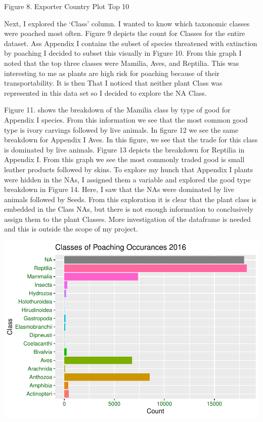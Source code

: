 \documentclass[
  12pt,
]{article}
\begin{document}
Figure 8. Exporter Country Plot Top 10

Next, I explored the `Class' column. I wanted to know which taxonomic
classes were poached most often. Figure 9 depicts the count for Classes
for the entire dataset. Ass Appendix I contains the subset of species
threatened with extinction by poaching I decided to subset this visually
in Figure 10. From this graph I noted that the top three classes were
Mamilia, Aves, and Reptilia. This was interesting to me as plants are
high risk for poaching because of their transportability. It is then
That I noticed that neither plant Class was represented in this data set
so I decided to explore the NA Class.

Figure 11. shows the breakdown of the Mamilia class by type of good for
Appendix I species. From this information we see that the most common
good type is ivory carvings followed by live animals. In figure 12 we
see the same breakdown for Appendix I Aves. In this figure, we see that
the trade for this class is dominated by live animals. Figure 13 depicts
the breakdown for Reptilia in Appendix I. From this graph we see the
most commonly traded good is small leather products followed by skins.
To explore my hunch that Appendix I plants were hidden in the NAs, I
assigned them a variable and explored the good type breakdown in Figure
14. Here, I saw that the NAs were dominated by live animals followed by
Seeds. From this exploration it is clear that the plant class is
embedded in the Class NAs, but there is not enough information to
conclusively assign them to the plant Classes. More investigation of the
dataframe is needed and this is outside the scope of my project.

\includegraphics{Wood_ENV872_Project_files/figure-latex/unnamed-chunk-13-1.pdf}
\end{document}
